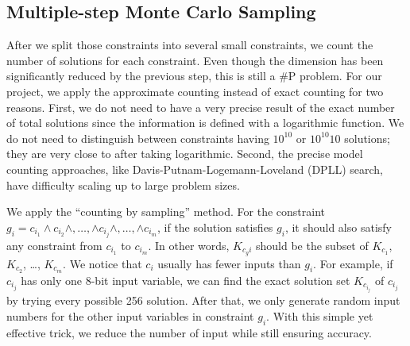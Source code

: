 
\subsection{Multiple-step Monte Carlo Sampling}

After we split those constraints into several small constraints, we count the
number of solutions for each constraint. Even though the dimension has been
significantly reduced by the previous step, this is still a \#P problem.
For our
project, we apply the approximate counting instead of exact counting for two
reasons. First, we do not need to have a very precise result of the exact number of total solutions since the information is defined with a logarithmic function.
We do not need to distinguish between constraints having $10^{10}$ or $10^{10}
    10$ solutions; they are very close to after taking logarithmic. Second, the
precise model counting approaches, like Davis-Putnam-Logemann-Loveland (DPLL)
search, have difficulty scaling up to large problem sizes.

We apply the ``counting by sampling'' method. For
the constraint $g_{i}= c_{i_1} \land c_{i_2} \land ,\ldots, \land c_{i_j} \land
    ,\ldots, \land c_{i_m}$, if the solution satisfies $g_{i}$, it should also
satisfy any constraint from $c_{i_1}$ to $c_{i_m}$. In other words, $K_{c_gi}$
should be the subset of $K_{c_1}$, $K_{c_2}$, \ldots , $K_{c_m}$. We notice that
$c_i$ usually has fewer inputs than $g_{i}$. For example, if
$c_{i_j}$ has only one 8-bit input variable, we can find the exact solution set
$K_{c_{i_j}}$ of $c_{i_j}$ by trying every possible 256 solution. After that,
we only generate random input numbers for the other input variables in
constraint $g_{i}$. With this simple yet effective trick, we reduce the number of input
while still ensuring accuracy.


